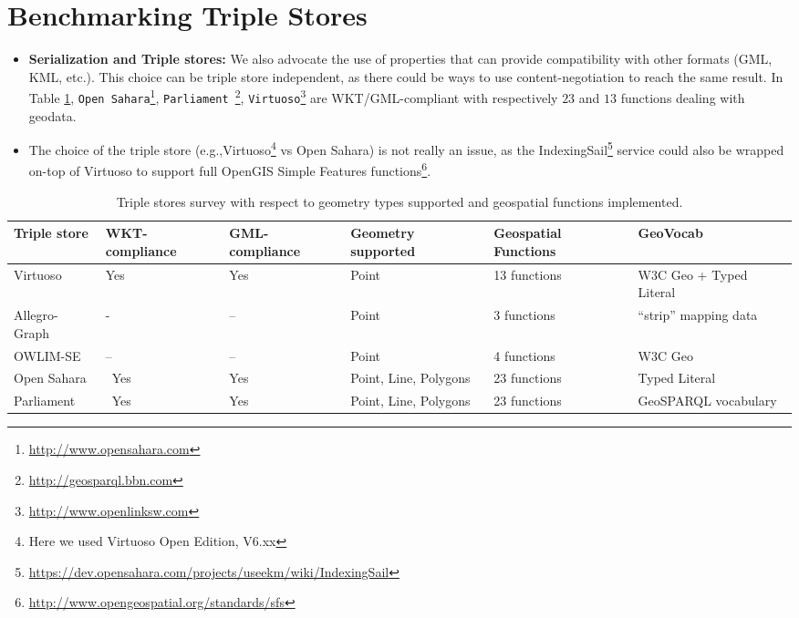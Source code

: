 \section{Benchmarking Triple Stores}

\begin{itemize}
\item \textbf{Serialization and Triple stores:} We also advocate the use of properties that can provide compatibility with other formats (GML, KML, etc.). This choice can be triple store independent, as there could be ways to use content-negotiation to reach the same result. In Table \ref{tab:triplestore}, \texttt{Open Sahara}\footnote{\url{http://www.opensahara.com}}, \texttt{Parliament }\footnote{\url{http://geosparql.bbn.com}},  \texttt{Virtuoso}\footnote{\url{http://www.openlinksw.com}} are WKT/GML-compliant with respectively $23$ and $13$ functions dealing with geodata.
\item The choice of the triple store (e.g.,Virtuoso\footnote{Here we used Virtuoso Open Edition, V6.xx} vs Open Sahara) is not really an issue, as the IndexingSail\footnote{\url{https://dev.opensahara.com/projects/useekm/wiki/IndexingSail}} service could also be wrapped on-top of Virtuoso to support full OpenGIS Simple Features functions\footnote{\url{http://www.opengeospatial.org/standards/sfs}}.
\end{itemize}

\begin{table}[!htbp]
 \begin{tabularx}{\textwidth}{|X|X|X|X|X|l|}
 \hline
 \textbf{Triple store} & WKT-compliance & GML-compliance & Geometry supported  & Geospatial Functions & GeoVocab \\ \hline
 Virtuoso & Yes & Yes & Point & 13 functions & W3C Geo + Typed Literal  \\ \hline
 Allegro-Graph & \-- & -- & Point & 3 functions & ``strip'' mapping data \\ \hline
 OWLIM-SE & -- & -- & Point & 4 functions & W3C Geo\\ \hline
 Open Sahara & \ Yes & Yes & Point, Line, Polygons & 23 functions  & Typed Literal \\ \hline
 Parliament & \ Yes & Yes & Point, Line, Polygons & 23 functions  &  GeoSPARQL vocabulary\\ \hline
 \end{tabularx}
\caption{Triple stores survey with respect to geometry types supported and geospatial functions implemented.}
\label{tab:triplestore}
\end{table}

